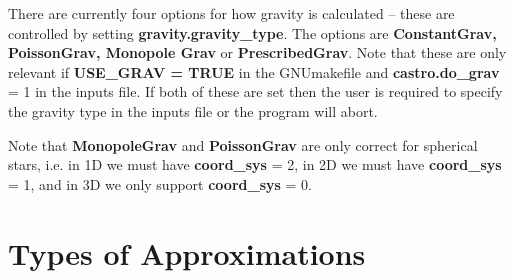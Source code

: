 There are currently four options for how gravity is calculated -- 
these are controlled by setting {\bf gravity.gravity\_type}.  
The options are {\bf ConstantGrav, PoissonGrav, Monopole Grav} or {\bf PrescribedGrav}.
Note that these are only relevant if {\bf USE\_GRAV = TRUE} in the GNUmakefile
and {\bf castro.do\_grav} = 1 in the inputs file.  If both of these are
set then the user is required to specify the gravity type in the inputs file
or the program will abort. 

Note that  {\bf MonopoleGrav} and {\bf PoissonGrav} are only correct for
spherical stars, i.e. in 1D we must have {\bf coord\_sys} = 2, 
in 2D we must have {\bf coord\_sys} = 1, and in 3D we only support {\bf coord\_sys} = 0.

\section{Types of Approximations}

